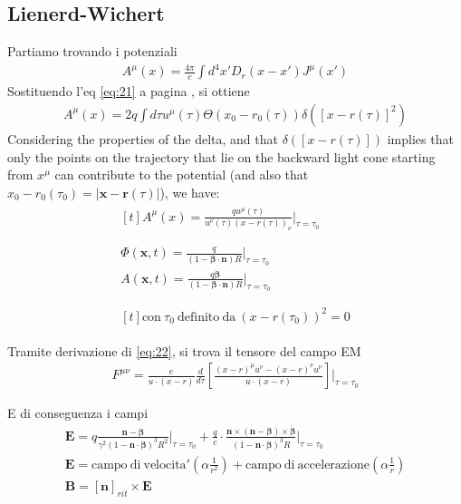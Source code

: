 \documentclass[a4paper, twocolumn]{article}
\begin{document}
\subsection{Lienerd-Wichert}
\label{sec:lienerd-wichert}
Partiamo trovando i potenziali
\begin{align}
  \label{eq:17}
  A^\mu(x)=\frac{4\pi}{c}\int d^4x'D_r(x-x')J^\mu(x')
\end{align}
Sostituendo l'eq \ref{eq:21} a pagina \pageref{eq:21}, si ottiene
\begin{align}
  \label{eq:22}
  A^\mu(x)=2q \int d\tau u^\mu(\tau)\Theta(x_0-r_0(\tau))\delta([x-r(\tau)]^2)
\end{align}
Considering the properties of the delta, and that  $\delta([x-r(\tau)])$ implies that only the points on the trajectory that lie on the backward light cone starting from $x^\mu$ can contribute to the potential (and also that $x_0-r_0(\tau_0)=\left| \mathbf{x}-\mathbf{r}(\tau) \right|$), we have:
\begin{gather}
  \label{eq:23}
  \begin{aligned}[t]
    A^\mu(x)=\frac{qu^\mu(\tau)}{u^\nu(\tau)(x-r(\tau))_{\nu}}\bigg\rvert_{\tau=\tau_0} \\
  \end{aligned} \\ 
  \begin{split}
    \Phi(\mathbf{x},t)=\frac{q}{(1-\boldsymbol{\beta}\cdot\mathbf{n})R}\bigg\rvert_{\tau=\tau_0} \\
    A(\mathbf{x},t)=\frac{q\boldsymbol{\beta}}{(1-\boldsymbol{\beta}\cdot\mathbf{n})R}\bigg\rvert_{\tau=\tau_0} \\  
  \end{split} \\
  \begin{aligned}[t]
    \mathrm{con}~ \tau_0~ \mathrm{definito~da} ~(x-r(\tau_0))^2=0
  \end{aligned}  
\end{gather}

Tramite derivazione di \ref{eq:22}, si trova il tensore del campo EM
\begin{align}
  \label{eq:24}
  F^{\mu\nu}=\frac{e}{u\cdot(x-r)}\frac{d}{d\tau}\left[ \frac{(x-r)^\mu u^\nu - (x-r)^\nu u^\nu}{u\cdot(x-r)}   \right]   \Biggl\rvert_{\tau=\tau_0}
\end{align}

E di conseguenza i campi
\begin{align}
  \label{eq:25}
  \mathbf{E}=q \frac{\mathbf{n}-\mathbf{\beta}}{\gamma^2(1-\mathbf{n}\cdot\mathbf{\beta})^3R^2} \biggl\rvert_{\tau=\tau_0}  +\frac{q}{c}\cdot\frac{\mathbf{n}\times(\mathbf{n}-\mathbf{\beta})\times\dot{\mathbf{\beta}}}{(1-\mathbf{n}\cdot\mathbf{\beta})^3 R}\Biggl\rvert_{\tau=\tau_0}\\
  \mathbf{E}=\mathrm{campo~di~velocita'}(\alpha \frac{1}{r^2}) + \mathrm{campo~di~accelerazione}(\alpha \frac{1}{r}) \\
  \mathbf{B}=[\mathbf{n}]_{rit}\times\mathbf{E} \\
\end{align}
\end{document}
